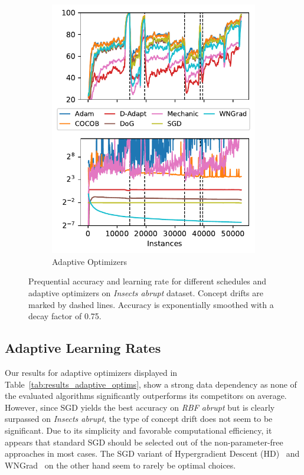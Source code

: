 \documentclass[runningheads]{llncs}
\begin{document}
\begin{figure}[ht]
\begin{subfigure}[b]{0.99\textwidth - \asize}
		\includegraphics[width=\textwidth]{figures/lr_norms_optims_insects_abrupt.pdf}
		\caption{Adaptive Optimizers}
		\label{fig:prequential_optims_insects}
	\end{subfigure}
	\caption{Prequential accuracy and learning rate for different schedules and adaptive optimizers on \textit{Insects abrupt} dataset. Concept drifts are marked by dashed lines. Accuracy is exponentially smoothed with a decay factor of 0.75.}
\end{figure}

\subsection{Adaptive Learning Rates}

Our results for adaptive optimizers displayed in Table~\ref{tab:results_adaptive_optims}, show a strong data dependency as none of the evaluated algorithms significantly outperforms its competitors on average.
However, since SGD yields the best accuracy on \textit{RBF abrupt} but is clearly surpassed on \textit{Insects abrupt}, the type of concept drift does not seem to be significant.
Due to its simplicity and favorable computational efficiency, it appears that standard SGD should be selected out of the non-parameter-free approaches in most cases.
The SGD variant of Hypergradient Descent (HD)~\cite{baydinOnlineLearningRate2018} and WNGrad~\cite{wuWNGradLearnLearning2020} on the other hand seem to rarely be optimal choices.
\end{document}
